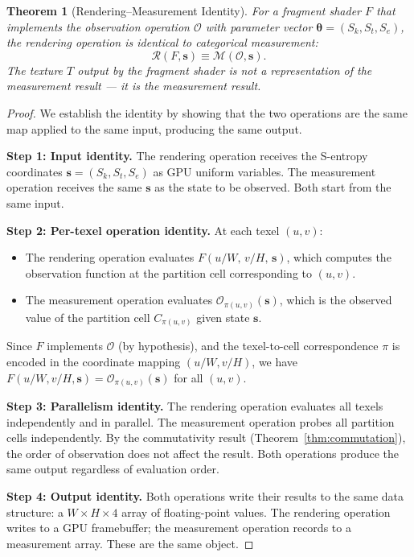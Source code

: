\documentclass[11pt,twocolumn,a4paper]{article}
\newtheorem{theorem}{Theorem}[section]
\newcommand{\Sk}{S_k}
\newcommand{\St}{S_t}
\newcommand{\Se}{S_e}
\newcommand{\Obs}{\mathcal{O}}
\newcommand{\Rend}{\mathcal{R}}
\newcommand{\Meas}{\mathcal{M}}
\begin{document}
\begin{theorem}[Rendering--Measurement Identity]
\label{thm:rmi}
For a fragment shader $F$ that implements the observation operation
$\Obs$ with parameter vector $\bm{\theta} = (\Sk, \St, \Se)$, the
rendering operation is identical to categorical measurement:
\begin{equation}
\boxed{
\Rend(F, \bm{s}) \equiv \Meas(\Obs, \bm{s}).
}
\label{eq:rmi}
\end{equation}
The texture $T$ output by the fragment shader is not a representation
of the measurement result --- it \emph{is} the measurement result.
\end{theorem}

\begin{proof}
We establish the identity by showing that the two operations are the
same map applied to the same input, producing the same output.

\textbf{Step 1: Input identity.} The rendering operation receives
the S-entropy coordinates $\bm{s} = (\Sk, \St, \Se)$ as GPU
uniform variables. The measurement operation receives the same
$\bm{s}$ as the state to be observed. Both start from the same
input.

\textbf{Step 2: Per-texel operation identity.} At each texel $(u,v)$:
\begin{itemize}[leftmargin=*]
\item The rendering operation evaluates
  $F(u/W,\, v/H,\, \bm{s})$, which computes the observation function
  at the partition cell corresponding to $(u,v)$.
\item The measurement operation evaluates
  $\Obs_{\pi(u,v)}(\bm{s})$, which is the observed value of the
  partition cell $C_{\pi(u,v)}$ given state $\bm{s}$.
\end{itemize}
Since $F$ implements $\Obs$ (by hypothesis), and the texel-to-cell
correspondence $\pi$ is encoded in the coordinate mapping $(u/W, v/H)$,
we have $F(u/W, v/H, \bm{s}) = \Obs_{\pi(u,v)}(\bm{s})$ for all
$(u,v)$.

\textbf{Step 3: Parallelism identity.} The rendering operation
evaluates all texels independently and in parallel. The measurement
operation probes all partition cells independently. By the commutativity
result (Theorem~\ref{thm:commutation}), the order of observation does
not affect the result. Both operations produce the same output
regardless of evaluation order.

\textbf{Step 4: Output identity.} Both operations write their
results to the same data structure: a $W \times H \times 4$ array
of floating-point values. The rendering operation writes to a GPU
framebuffer; the measurement operation records to a measurement
array. These are the same object.


\end{proof}
\end{document}
